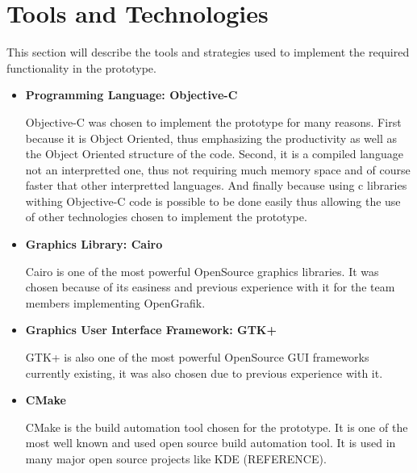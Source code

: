 \section{Tools and Technologies}
This section will describe the tools and strategies used to implement the required functionality in the prototype.
\begin{itemize}
\item {\bf Programming Language: Objective-C}
\par \noindent
Objective-C was chosen to implement the prototype for many reasons. First because it is Object Oriented, thus emphasizing the productivity as well as the Object Oriented structure of the code. Second, it is a compiled language not an interpretted one, thus not requiring much memory space and of course faster that other interpretted languages. And finally because using c libraries withing Objective-C code is possible to be done easily thus allowing the use of other technologies chosen to implement the prototype.

\item {\bf Graphics Library: Cairo}
\par \noindent
Cairo is one of the most powerful OpenSource graphics libraries. It was chosen because of its easiness and previous experience with it for the team members implementing OpenGrafik.

\item {\bf Graphics User Interface Framework: GTK+}
\par \noindent
GTK+ is also one of the most powerful OpenSource GUI frameworks currently existing, it was also chosen due to previous experience with it.

\item {\bf CMake}
\par \noindent
CMake is the build automation tool chosen for the prototype. It is one of the most well known and used open source build automation tool. It is used in many major open source projects like KDE (REFERENCE).
\end{itemize}

